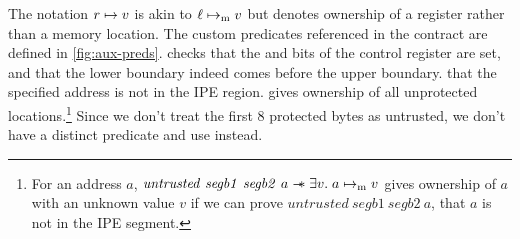 The notation \(r \mapsto v\) is akin to \(\ell \mapsto_{\mathrm{m}} v\) but denotes ownership of a register rather than a memory location. The custom predicates referenced in the contract are defined in \cref{fig:aux-preds}.  checks that the  and  bits of the control register are set, and that the lower boundary indeed comes before the upper boundary.  that the specified address is not in the IPE region.  gives ownership of all unprotected locations.\footnote{
For an address \(a\), \(\mathit{untrusted}~\mathit{segb1}~\mathit{segb2}~a
\mathrel{-\!\!\ast} \exists v.\; a \mapsto_{\mathrm{m}} v\) gives ownership of \(a\) with an unknown value \(v\) if we can prove \(\mathit{untrusted}~\mathit{segb1}~\mathit{segb2}~a\), \ie that \(a\) is not in the IPE segment.} Since we don't treat the first 8 protected bytes as untrusted, we don't have a distinct  predicate and use  instead.

